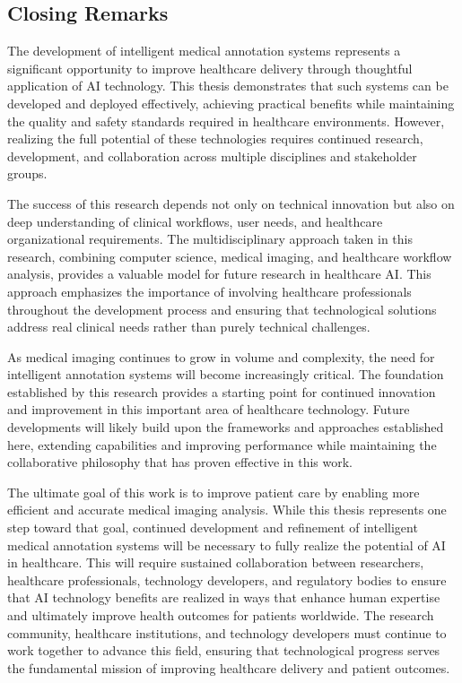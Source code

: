 \subsection{Closing Remarks}

The development of intelligent medical annotation systems represents a significant opportunity to improve healthcare delivery through thoughtful application of AI technology. This thesis demonstrates that such systems can be developed and deployed effectively, achieving practical benefits while maintaining the quality and safety standards required in healthcare environments. However, realizing the full potential of these technologies requires continued research, development, and collaboration across multiple disciplines and stakeholder groups.

The success of this research depends not only on technical innovation but also on deep understanding of clinical workflows, user needs, and healthcare organizational requirements. The multidisciplinary approach taken in this research, combining computer science, medical imaging, and healthcare workflow analysis, provides a valuable model for future research in healthcare AI. This approach emphasizes the importance of involving healthcare professionals throughout the development process and ensuring that technological solutions address real clinical needs rather than purely technical challenges.

As medical imaging continues to grow in volume and complexity, the need for intelligent annotation systems will become increasingly critical. The foundation established by this research provides a starting point for continued innovation and improvement in this important area of healthcare technology. Future developments will likely build upon the frameworks and approaches established here, extending capabilities and improving performance while maintaining the collaborative philosophy that has proven effective in this work.

The ultimate goal of this work is to improve patient care by enabling more efficient and accurate medical imaging analysis. While this thesis represents one step toward that goal, continued development and refinement of intelligent medical annotation systems will be necessary to fully realize the potential of AI in healthcare. This will require sustained collaboration between researchers, healthcare professionals, technology developers, and regulatory bodies to ensure that AI technology benefits are realized in ways that enhance human expertise and ultimately improve health outcomes for patients worldwide. The research community, healthcare institutions, and technology developers must continue to work together to advance this field, ensuring that technological progress serves the fundamental mission of improving healthcare delivery and patient outcomes. 